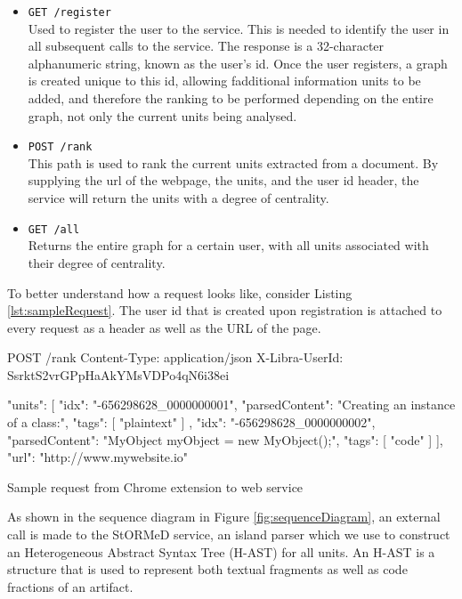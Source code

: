 \begin{itemize}
\item \texttt{GET /register}\\
Used to register the user to the service. This is needed to identify the user in all subsequent calls to the service. The response is a 32-character alphanumeric string, known as the user's id. Once the user registers, a graph is created unique to this id, allowing fadditional information units to be added, and therefore the ranking to be performed depending on the entire graph, not only the current units being analysed.
\item \texttt{POST /rank}\\
This path is used to rank the current units extracted from a document. By supplying the url of the webpage, the units, and the user id header, the service will return the units with a degree of centrality. 
\item \texttt{GET /all}\\
Returns the entire graph for a certain user, with all units associated with their degree of centrality.
\end{itemize}



To better understand how a request looks like, consider Listing \ref{lst:sampleRequest}. The user id that is created upon registration is attached to every request as a header as well as the URL of the page. 
\begin{listing}[H]
\centering	
\begin{jsoncode}
POST /rank
Content-Type: application/json
X-Libra-UserId: SsrktS2vrGPpHaAkYMsVDPo4qN6i38ei

{
  "units": [
    {
      "idx": "-656298628_0000000001",
      "parsedContent": "Creating an instance of a class:",
      "tags": [
        "plaintext"
      ]
    },
    {
      "idx": "-656298628_0000000002",
      "parsedContent": "MyObject myObject = new MyObject();",
      "tags": [
        "code"
      ]
    }
  ],
  "url": "http://www.mywebsite.io"
}
\end{jsoncode}
\caption{Sample request from Chrome extension to web service}
\label{lst:sampleRequest}
\end{listing}

As shown in the sequence diagram in Figure \ref{fig:sequenceDiagram}, an external call is made to the StORMeD service, an island parser which we use to construct an Heterogeneous Abstract Syntax Tree (H-AST)\cite{Ponz2017a} for all units. An H-AST is a structure that is used to represent both textual fragments as well as code fractions of an artifact. 


